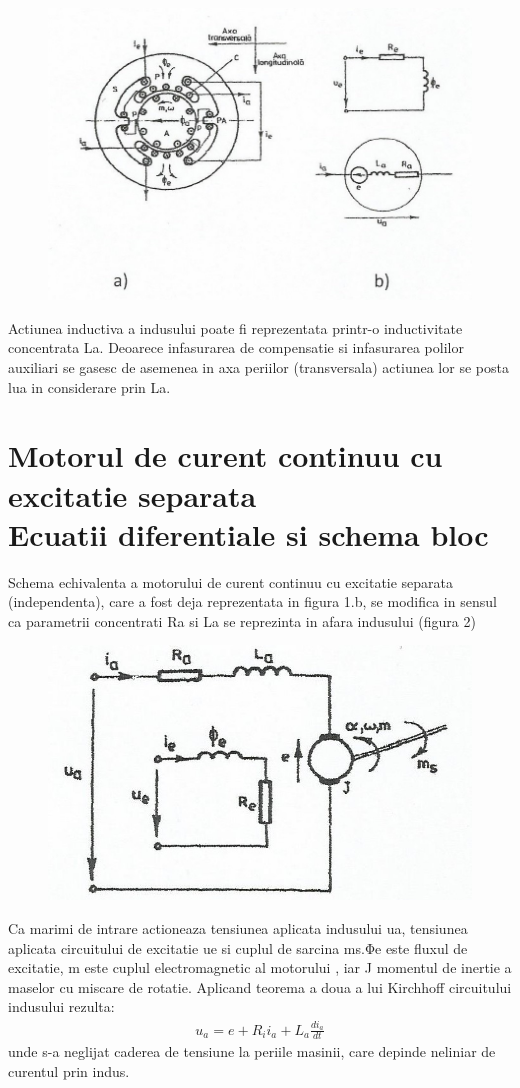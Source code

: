 \documentclass[11pt]{article}
\begin{document}
\begin{figure}[H]
	\centering
	\includegraphics[width=.7\linewidth]{fig1.jpg}
	\label{fig:test2}
\end{figure}

Actiunea inductiva a indusului poate fi reprezentata printr-o inductivitate concentrata La. Deoarece infasurarea de compensatie si infasurarea polilor auxiliari se gasesc de asemenea in axa periilor (transversala) actiunea lor se posta lua in considerare prin La.

\section{Motorul de curent continuu cu excitatie separata \\
	Ecuatii diferentiale si schema bloc}
Schema echivalenta a motorului de curent continuu cu excitatie separata (independenta), care a fost deja reprezentata in figura 1.b, se modifica in sensul ca parametrii concentrati Ra si La se reprezinta in afara indusului (figura 2)
\begin{figure}[H]
	\centering
	\includegraphics[width=.5\linewidth]{fig2.png}
	\label{fig:test2}
\end{figure}

Ca marimi de intrare actioneaza tensiunea aplicata indusului ua, tensiunea aplicata circuitului de excitatie ue si cuplul de sarcina ms.Φe este fluxul de excitatie, m este cuplul electromagnetic al motorului , iar J momentul de inertie a maselor cu miscare de rotatie. 
Aplicand teorema a doua a lui Kirchhoff circuitului indusului rezulta:
\begin{align}
u_a=e+R_ii_a+L_a\frac{di_a}{dt}
\end{align}
unde s-a neglijat caderea de tensiune la periile masinii, care depinde neliniar de curentul prin indus.
\end{document}
